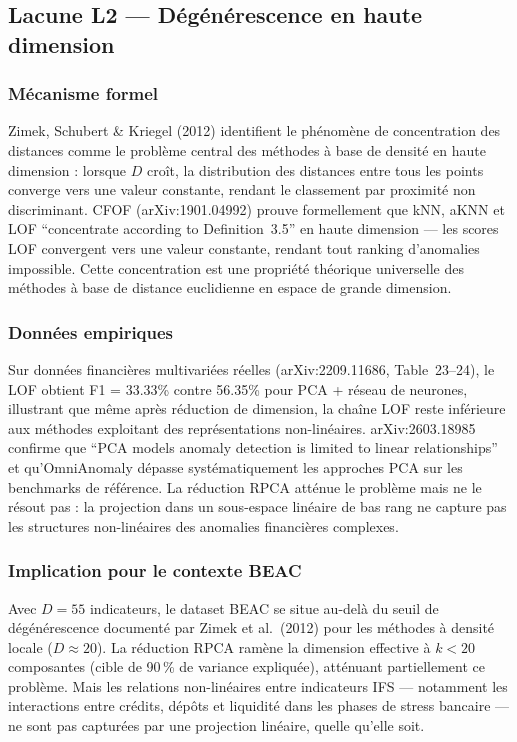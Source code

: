 \documentclass[12pt,a4paper]{article}
\begin{document}
\subsection{Lacune L2 --- Dégénérescence en haute dimension}

\subsubsection{Mécanisme formel}

Zimek, Schubert \& Kriegel (2012) identifient le phénomène de concentration
des distances comme le problème central des méthodes à base de densité en
haute dimension : lorsque $D$ croît, la distribution des distances entre
tous les points converge vers une valeur constante, rendant le classement
par proximité non discriminant. CFOF (arXiv:1901.04992) prouve formellement
que kNN, aKNN et LOF ``concentrate according to Definition~3.5'' en haute
dimension --- les scores LOF convergent vers une valeur constante, rendant
tout ranking d'anomalies impossible. Cette concentration est une propriété
théorique universelle des méthodes à base de distance euclidienne en espace
de grande dimension.

\subsubsection{Données empiriques}

Sur données financières multivariées réelles (arXiv:2209.11686, Table~23--24),
le LOF obtient F1 = 33.33\% contre 56.35\% pour PCA + réseau de neurones,
illustrant que même après réduction de dimension, la chaîne LOF reste inférieure
aux méthodes exploitant des représentations non-linéaires. arXiv:2603.18985
confirme que ``PCA models anomaly detection is limited to linear relationships''
et qu'OmniAnomaly dépasse systématiquement les approches PCA sur les benchmarks
de référence. La réduction RPCA atténue le problème mais ne le résout pas :
la projection dans un sous-espace linéaire de bas rang ne capture pas les
structures non-linéaires des anomalies financières complexes.

\subsubsection{Implication pour le contexte BEAC}

Avec $D = 55$ indicateurs, le dataset BEAC se situe au-delà du seuil de
dégénérescence documenté par Zimek et al.\ (2012) pour les méthodes à densité
locale ($D \approx 20$). La réduction RPCA ramène la dimension effective
à $k < 20$ composantes (cible de 90\,\% de variance expliquée), atténuant
partiellement ce problème. Mais les relations non-linéaires entre indicateurs
IFS --- notamment les interactions entre crédits, dépôts et liquidité dans
les phases de stress bancaire --- ne sont pas capturées par une projection
linéaire, quelle qu'elle soit.
\end{document}
